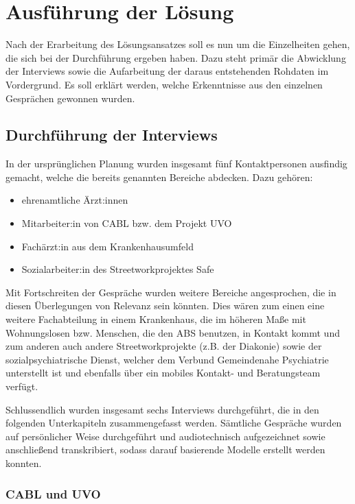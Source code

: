 \chapter{Ausführung der Lösung}\label{ch:solution}

Nach der Erarbeitung des Lösungsansatzes soll es nun um die Einzelheiten gehen, die sich bei der Durchführung ergeben haben. Dazu steht primär die Abwicklung der Interviews sowie die Aufarbeitung der daraus entstehenden Rohdaten im Vordergrund. Es soll erklärt werden, welche Erkenntnisse aus den einzelnen Gesprächen gewonnen wurden.

\section{Durchführung der Interviews}\label{sec:interviews}

In der ursprünglichen Planung wurden insgesamt fünf Kontaktpersonen ausfindig gemacht, welche die bereits genannten Bereiche abdecken. Dazu gehören:

\begin{itemize}
	\item ehrenamtliche Ärzt:innen
	\item Mitarbeiter:in von \ac{CABL} bzw. dem Projekt \ac{UVO}
	\item Fachärzt:in aus dem Krankenhausumfeld
	\item Sozialarbeiter:in des Streetworkprojektes \ac{Safe}
\end{itemize}

Mit Fortschreiten der Gespräche wurden weitere Bereiche angesprochen, die in diesen Überlegungen von Relevanz sein könnten. Dies wären zum einen eine weitere Fachabteilung in einem Krankenhaus, die im höheren Maße mit Wohnungslosen bzw. Menschen, die den \ac{ABS} benutzen, in Kontakt kommt und zum anderen auch andere Streetworkprojekte (z.B. der Diakonie) sowie der sozialpsychiatrische Dienst, welcher dem Verbund Gemeindenahe Psychiatrie unterstellt ist und ebenfalls über ein mobiles Kontakt- und Beratungsteam verfügt. 

Schlussendlich wurden insgesamt sechs Interviews durchgeführt, die in den folgenden Unterkapiteln zusammengefasst werden. Sämtliche Gespräche wurden auf persönlicher Weise durchgeführt und audiotechnisch aufgezeichnet sowie anschließend transkribiert, sodass darauf basierende Modelle erstellt werden konnten.

\subsection{CABL und UVO}

